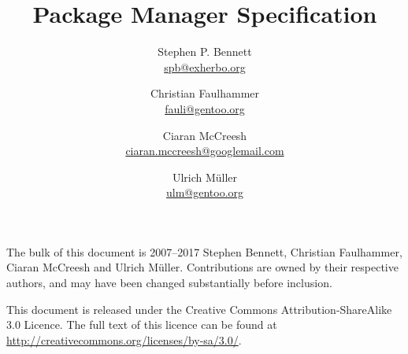 \documentclass{pms}
\title{Package Manager Specification}
\author{%
    Stephen P. Bennett \\
    \href{mailto:spb@exherbo.org}{spb@exherbo.org}
    \and
    Christian Faulhammer \\
    \href{mailto:fauli@gentoo.org}{fauli@gentoo.org}
    \and
    Ciaran McCreesh \\
    \href{mailto:ciaran.mccreesh@googlemail.com}{ciaran.mccreesh@googlemail.com}
    \and
    Ulrich Müller \\
    \href{mailto:ulm@gentoo.org}{ulm@gentoo.org}
}
\begin{document}
\maketitle

\thispagestyle{empty}
\vspace*{\fill}
{%
    \small
    The bulk of this document is \textcopyright{} 2007--2017 Stephen Bennett, Christian Faulhammer,
    Ciaran McCreesh and Ulrich Müller. Contributions are owned by their respective authors, and may
    have been changed substantially before inclusion.

    This document is released under the Creative Commons Attribution-ShareAlike 3.0 Licence. The
    full text of this licence can be found at \url{http://creativecommons.org/licenses/by-sa/3.0/}.

    \commitinfo
}

\tableofcontents
\listofalgorithms
\listoflistings
\listoftables































\appendix
\setcounter{secnumdepth}{0}





\end{document}
